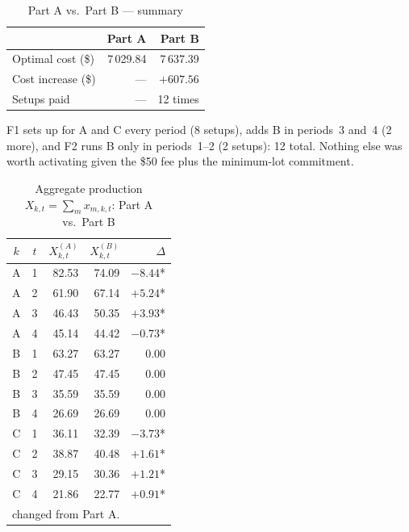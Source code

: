 \documentclass[11pt,a4paper]{article}
\begin{document}
\begin{table}[H]
  \centering
  \caption{Part A vs.\ Part B --- summary}
  \begin{tabular}{lrr}
    \toprule
                       & Part A    & Part B    \\
    \midrule
    Optimal cost (\$)  & 7\,029.84 & 7\,637.39 \\
    Cost increase (\$) & ---       & $+607.56$ \\
    Setups paid        & ---       & 12 times  \\
    \bottomrule
  \end{tabular}
\end{table}

F1 sets up for A and C every period (8 setups), adds B in periods~3 and~4
(2 more), and F2 runs B only in periods~1--2 (2 setups): 12 total. Nothing
else was worth activating given the \$50 fee plus the minimum-lot commitment.

\begin{table}[H]
  \centering
  \caption{Aggregate production $X_{k,t}=\sum_m x_{m,k,t}$: Part A vs.\ Part B}
  \label{tab:comparison}
  \small
  \begin{tabular}{ccrrr}
    \toprule
    $k$ & $t$ & $X^{(A)}_{k,t}$ & $X^{(B)}_{k,t}$ & $\Delta$   \\
    \midrule
    A   & 1   & 82.53           & 74.09           & $-8.44$\;* \\
    A   & 2   & 61.90           & 67.14           & $+5.24$\;* \\
    A   & 3   & 46.43           & 50.35           & $+3.93$\;* \\
    A   & 4   & 45.14           & 44.42           & $-0.73$\;* \\
    \midrule
    B   & 1   & 63.27           & 63.27           & $0.00$     \\
    B   & 2   & 47.45           & 47.45           & $0.00$     \\
    B   & 3   & 35.59           & 35.59           & $0.00$     \\
    B   & 4   & 26.69           & 26.69           & $0.00$     \\
    \midrule
    C   & 1   & 36.11           & 32.39           & $-3.73$\;* \\
    C   & 2   & 38.87           & 40.48           & $+1.61$\;* \\
    C   & 3   & 29.15           & 30.36           & $+1.21$\;* \\
    C   & 4   & 21.86           & 22.77           & $+0.91$\;* \\
    \bottomrule
    \multicolumn{5}{l}{\small * changed from Part A.}
  \end{tabular}
\end{table}
\end{document}
